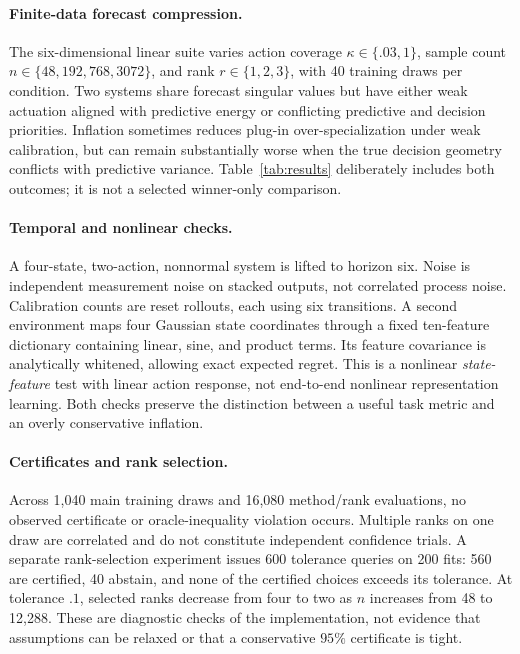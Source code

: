 \documentclass{article}
\begin{document}
\paragraph{Finite-data forecast compression.}
The six-dimensional linear suite varies action coverage $\kappa\in\{.03,1\}$, sample count $n\in\{48,192,768,3072\}$, and rank $r\in\{1,2,3\}$, with 40 training draws per condition. Two systems share forecast singular values but have either weak actuation aligned with predictive energy or conflicting predictive and decision priorities. Inflation sometimes reduces plug-in over-specialization under weak calibration, but can remain substantially worse when the true decision geometry conflicts with predictive variance. Table~\ref{tab:results} deliberately includes both outcomes; it is not a selected winner-only comparison.

\begin{table}[t]
\centering\small
\resizebox{\linewidth}{!}{}
\caption{True excess planning cost (mean $\pm$ one standard error over 40 training draws). Rows use, respectively, $n=192,768,256,256$ and action coverages $.03,.03,.3,.1$. Linear ranks are one; the remaining ranks are two. Full is uncompressed and not capacity-matched. All configurations, including oracle geometry and the balanced-state baseline, are in the supplied CSV.}\label{tab:results}
\end{table}

\paragraph{Temporal and nonlinear checks.}
A four-state, two-action, nonnormal system is lifted to horizon six. Noise is independent measurement noise on stacked outputs, not correlated process noise. Calibration counts are reset rollouts, each using six transitions. A second environment maps four Gaussian state coordinates through a fixed ten-feature dictionary containing linear, sine, and product terms. Its feature covariance is analytically whitened, allowing exact expected regret. This is a nonlinear \emph{state-feature} test with linear action response, not end-to-end nonlinear representation learning. Both checks preserve the distinction between a useful task metric and an overly conservative inflation.

\paragraph{Certificates and rank selection.}
Across 1,040 main training draws and 16,080 method/rank evaluations, no observed certificate or oracle-inequality violation occurs. Multiple ranks on one draw are correlated and do not constitute independent confidence trials. A separate rank-selection experiment issues 600 tolerance queries on 200 fits: 560 are certified, 40 abstain, and none of the certified choices exceeds its tolerance. At tolerance $.1$, selected ranks decrease from four to two as $n$ increases from 48 to 12,288. These are diagnostic checks of the implementation, not evidence that assumptions can be relaxed or that a conservative $95\%$ certificate is tight.
\end{document}
